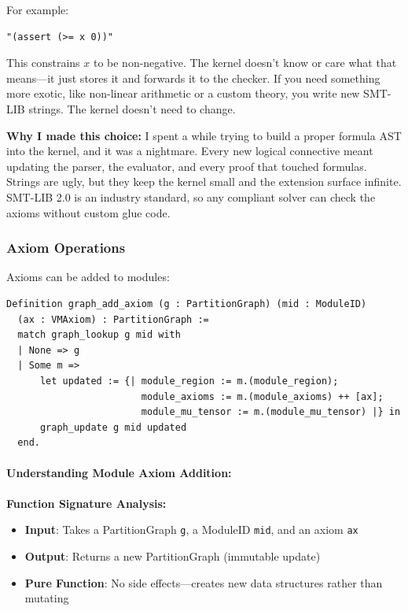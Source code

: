 For example:
\begin{lstlisting}
"(assert (>= x 0))"
\end{lstlisting}
This constrains $x$ to be non-negative. The kernel doesn't know or care what that means---it just stores it and forwards it to the checker. If you need something more exotic, like non-linear arithmetic or a custom theory, you write new SMT-LIB strings. The kernel doesn't need to change.

\textbf{Why I made this choice:} I spent a while trying to build a proper formula AST into the kernel, and it was a nightmare. Every new logical connective meant updating the parser, the evaluator, and every proof that touched formulas. Strings are ugly, but they keep the kernel small and the extension surface infinite. SMT-LIB 2.0 is an industry standard, so any compliant solver can check the axioms without custom glue code.

\subsubsection{Axiom Operations}

Axioms can be added to modules:
\begin{lstlisting}
Definition graph_add_axiom (g : PartitionGraph) (mid : ModuleID)
  (ax : VMAxiom) : PartitionGraph :=
  match graph_lookup g mid with
  | None => g
  | Some m =>
      let updated := {| module_region := m.(module_region);
                        module_axioms := m.(module_axioms) ++ [ax];
                        module_mu_tensor := m.(module_mu_tensor) |} in
      graph_update g mid updated
  end.
\end{lstlisting}

\paragraph{Understanding Module Axiom Addition:}
\textbf{Function Signature Analysis:}
\begin{itemize}
    \item \textbf{Input}: Takes a PartitionGraph \texttt{g}, a ModuleID \texttt{mid}, and an axiom \texttt{ax}
    \item \textbf{Output}: Returns a new PartitionGraph (immutable update)
    \item \textbf{Pure Function}: No side effects—creates new data structures rather than mutating
\end{itemize}

